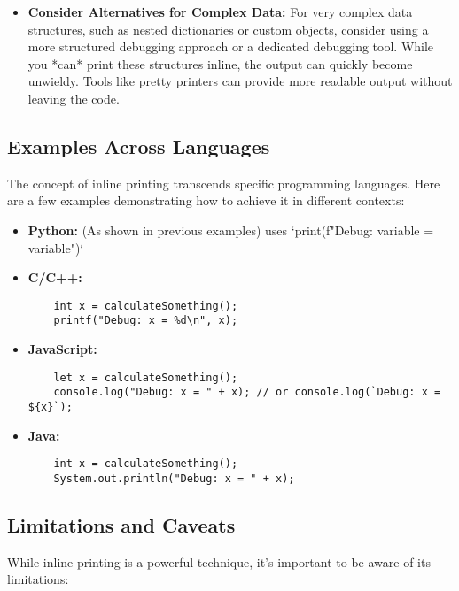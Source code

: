 \documentclass{article}
\begin{document}
{{{{\begin{itemize}
    \item \textbf{Consider Alternatives for Complex Data:} For very complex data structures, such as nested dictionaries or custom objects, consider using a more structured debugging approach or a dedicated debugging tool. While you *can* print these structures inline, the output can quickly become unwieldy. Tools like pretty printers can provide more readable output without leaving the code.
\end{itemize}

\subsection*{Examples Across Languages}

The concept of inline printing transcends specific programming languages. Here are a few examples demonstrating how to achieve it in different contexts:

\begin{itemize}
    \item \textbf{Python:} (As shown in previous examples) uses `print(f"Debug: variable = {variable}")`

    \item \textbf{C/C++:}
    \begin{verbatim}
    int x = calculateSomething();
    printf("Debug: x = %d\n", x);
    \end{verbatim}

    \item \textbf{JavaScript:}
    \begin{verbatim}
    let x = calculateSomething();
    console.log("Debug: x = " + x); // or console.log(`Debug: x = ${x}`);
    \end{verbatim}

    \item \textbf{Java:}
    \begin{verbatim}
    int x = calculateSomething();
    System.out.println("Debug: x = " + x);
    \end{verbatim}
\end{itemize}

\subsection*{Limitations and Caveats}

While inline printing is a powerful technique, it's important to be aware of its limitations:

}}}}
\end{document}
